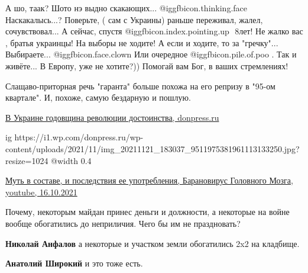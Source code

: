 \begin{itemize}

\obeycr
А шо, таак?
Шото нэ выдно скакающих... @igg{fbicon.thinking.face} 
Наскакалысь...?
Поверьте, ( сам с Украины) раньше переживал, жалел, сочувствовал... А сейчас, спустя @igg{fbicon.index.pointing.up} ️ 8лет! Не жалко вас , братья украинцы!
На выборы не ходите! А если и ходите, то за "гречку"... Выбираете... @igg{fbicon.face.clown}  Или очередное  @igg{fbicon.pile.of.poo} .
Так и живёте... В Европу, уже не хотите?))
Помогай вам Бог, в ваших стремлениях!
\restorecr


Слащаво-приторная речь "гаранта" больше похожа на его репризу в "95-ом
квартале". И, похоже, самую бездарную и пошлую.


\href{https://donpress.ru/v-ukraine-godovshhina-revoljucii-dostoinstva}{%
В Украине годовщина революции достоинства, donpress.ru%
}

\begin{multicols}{2}
\ifcmt
  ig https://i1.wp.com/donpress.ru/wp-content/uploads/2021/11/img_20211121_183037_9511975381961113133250.jpg?resize=1024%
  @width 0.4
\fi

\end{multicols}


\href{https://www.youtube.com/watch?v=VMCVY52yi68}{%
Муть в составе, и последствия ее употребления, Барановирус Головного Мозга, youtube, 16.10.2021%
}


Почему, некоторым майдан принес деньги и должности, а некоторые на войне вообще
обогатились до неприличия. Чего бы им не праздновать?

\begin{itemize} %
\textbf{Николай Анфалов} а некоторые и участком земли обогатились 2x2 на кладбище.

\textbf{Анатолий Широкий} и это тоже есть.
\end{itemize} %



\end{itemize} %
